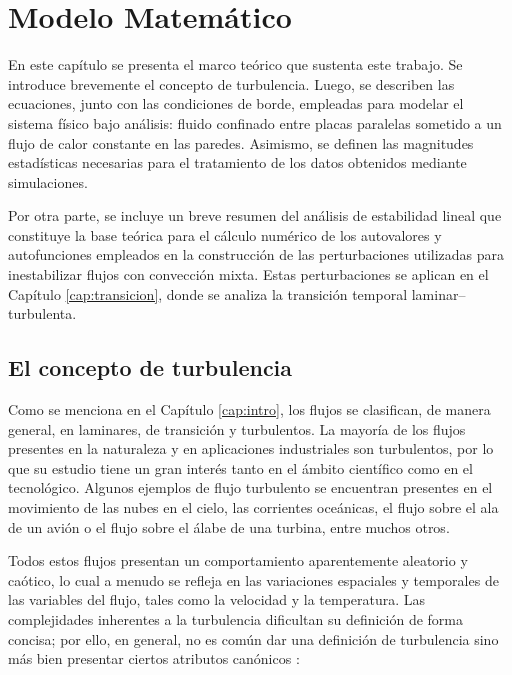 \chapter{Modelo Matemático} \label{cap:modelo}

En este capítulo se presenta el marco teórico que sustenta este trabajo. Se introduce brevemente el concepto de turbulencia. Luego, se describen las ecuaciones, junto con las condiciones de borde, empleadas para modelar el sistema físico bajo análisis: fluido confinado entre placas paralelas sometido a un flujo de calor constante en las paredes. Asimismo, se definen las magnitudes estadísticas necesarias para el tratamiento de los datos obtenidos mediante simulaciones.

Por otra parte, se incluye un breve resumen del análisis de estabilidad lineal que constituye la base teórica para el cálculo numérico de los autovalores y autofunciones empleados en la construcción de las perturbaciones utilizadas para inestabilizar flujos con convección mixta. Estas perturbaciones se aplican en el Capítulo \ref{cap:transicion}, donde se analiza la transición temporal laminar–turbulenta.

\section{El concepto de turbulencia}

Como se menciona en el Capítulo \ref{cap:intro}, los flujos se clasifican, de manera general, en laminares, de transición y turbulentos. La mayoría de los flujos presentes en la naturaleza y en aplicaciones industriales son turbulentos, por lo que su estudio tiene un gran interés tanto en el ámbito científico como en el tecnológico. Algunos ejemplos de flujo turbulento se encuentran presentes en el movimiento de las nubes en el cielo, las corrientes oceánicas, el flujo sobre el ala de un avión o el flujo sobre el álabe de una turbina, entre muchos otros.

Todos estos flujos presentan un comportamiento aparentemente aleatorio y caótico, lo cual a menudo se refleja en las variaciones espaciales y temporales de las variables del flujo, tales como la velocidad y la temperatura. Las complejidades inherentes a la turbulencia dificultan su definición de forma concisa; por ello, en general, no es común dar una definición de turbulencia sino más bien presentar ciertos atributos canónicos \cite{smits2009lectures}:

